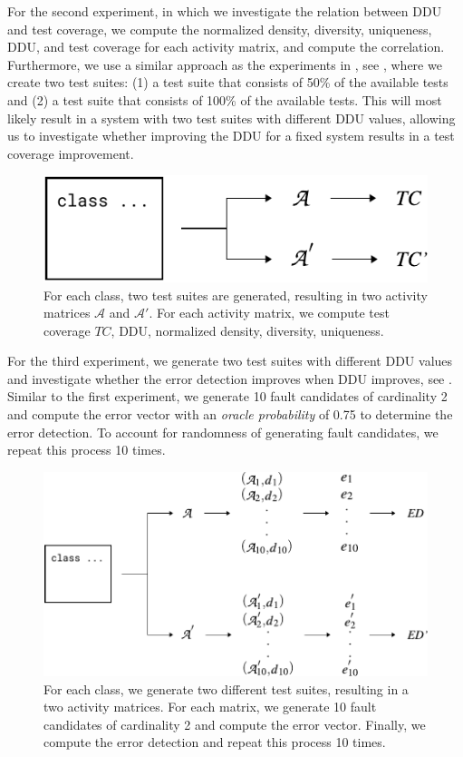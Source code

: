 \documentclass[twoside,a4paper,11pt]{memoir}
\begin{document}
For the second experiment, in which we investigate the relation between DDU and test coverage, we compute the normalized density, diversity, uniqueness, DDU, and test coverage for each activity matrix, and compute the correlation.
Furthermore, we use a similar approach as the experiments in , see , where we create two test suites: (1) a test suite that consists of 50\% of the available tests and (2) a test suite that consists of 100\% of the available tests.
This will most likely result in a system with two test suites with different DDU values, allowing us to investigate whether improving the DDU for a fixed system results in a test coverage improvement.
\begin{figure}
  \center%
  \includegraphics[width=0.6\linewidth]{figures/delta_test_coverage_approach}
  \caption{For each class, two test suites are generated, resulting in two activity matrices \(\mathcal{A} \) and \(\mathcal{A}' \). For each activity matrix, we compute test coverage \(TC \), DDU, normalized density, diversity, uniqueness.}%
  \label{fig:delta_test_coverage_approach}
\end{figure}

For the third experiment, we generate two test suites with different DDU values and investigate whether the error detection improves when DDU improves, see .
Similar to the first experiment, we generate 10 fault candidates of cardinality 2 and compute the error vector with an \emph{oracle probability} of 0.75 to determine the error detection.
To account for randomness of generating fault candidates, we repeat this process 10 times.
\begin{figure}
  \includegraphics[width=\linewidth]{figures/delta_error_detection_approach}
  \caption{For each class, we generate two different test suites, resulting in a two activity matrices. For each matrix, we generate 10 fault candidates of cardinality 2 and compute the error vector. Finally, we compute the error detection and repeat this process 10 times.}%
  \label{fig:delta_error_detection_approach}
\end{figure}
\end{document}
